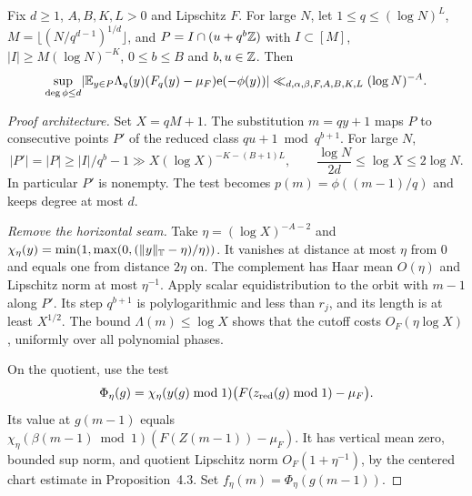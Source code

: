 \begin{proposition}\label{p:prime-phase}
\leanok
{}
Fix $d\ge1$, $A,B,K,L>0$ and Lipschitz $F$. For large $N$,
let $1\le q\le(\log N)^L$, $M=\lfloor(N/q^{d-1})^{1/d}\rfloor$,
and $P=I\cap(u+q^b\mathbb Z)$ with $I\subset[M]$, $|I|\ge M(\log N)^{-K}$,
$0\le b\le B$ and $b,u\in\mathbb Z$. Then
\[
 \sup_{\deg\phi\le d}\lvert\mathbb E_{y\in P}\Lambda_q(y)
 (F_q(y)-\mu_F)\mathrm e(-\phi(y))\rvert
 \ll_{d,\alpha,\beta,F,A,B,K,L}(\log N)^{-A}.
\]
\end{proposition}
\begin{proof}[Proof architecture]
\leanok
Set $X=qM+1$. The substitution $m=qy+1$ maps $P$ to consecutive
points $P'$ of the reduced class $qu+1\bmod q^{b+1}$. For large $N$,
\[
 |P'|=|P|\ge |I|/q^b-1\gg X(\log X)^{-K-(B+1)L},
 \qquad
 \frac{\log N}{2d}\le\log X\le2\log N.
\]
In particular $P'$ is nonempty. The test becomes
$p(m)=\phi((m-1)/q)$ and keeps degree at most $d$.

\emph{Remove the horizontal seam.}
Take $\eta=(\log X)^{-A-2}$ and
$\chi_\eta(y)=\min(1,\max(0,(\lVert y\rVert_{\mathbb T}-\eta)/\eta))$.
It vanishes at distance at most $\eta$ from $0$ and equals
one from distance $2\eta$ on. The complement has Haar mean
$O(\eta)$ and Lipschitz norm at most $\eta^{-1}$.
Apply scalar equidistribution to the orbit with $m-1$
along $P'$. Its step $q^{b+1}$ is polylogarithmic and less
than $r_j$, and its length is at least $X^{1/2}$. The bound
$\Lambda(m)\le\log X$ shows that the cutoff costs
$O_F(\eta\log X)$, uniformly over all polynomial phases.

On the quotient, use the test
\[
 \Phi_\eta(g)=
  \chi_\eta(y(g)\bmod1)\bigl(F(z_{\rm red}(g)\bmod1)-\mu_F\bigr).
\]
Its value at $g(m-1)$ equals
$\chi_\eta(\beta(m-1)\bmod1)(F(Z(m-1))-\mu_F)$.
It has vertical mean zero, bounded sup norm, and quotient Lipschitz
norm $O_F(1+\eta^{-1})$, by the centered chart estimate in
Proposition~4.3. Set $f_\eta(m)=\Phi_\eta(g(m-1))$.


\end{proof}
